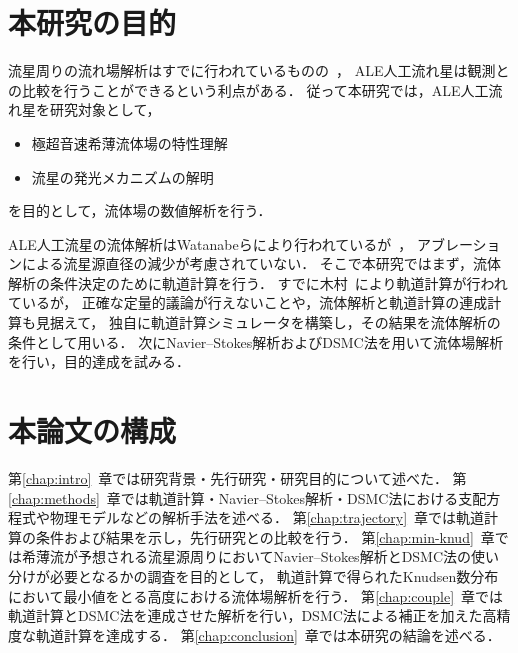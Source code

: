 \section{本研究の目的}

流星周りの流れ場解析はすでに行われているものの~\cite{silber2017shock}，
ALE人工流れ星は観測との比較を行うことができるという利点がある．
従って本研究では，ALE人工流れ星を研究対象として，
\begin{itemize}
    \item 極超音速希薄流体場の特性理解
    \item 流星の発光メカニズムの解明
\end{itemize}
を目的として，流体場の数値解析を行う．

ALE人工流星の流体解析はWatanabeらにより行われているが~\cite{watanabe2016development}，
アブレーションによる流星源直径の減少が考慮されていない．
そこで本研究ではまず，流体解析の条件決定のために軌道計算を行う．
すでに木村~\cite{kimura2018master}により軌道計算が行われているが，
正確な定量的議論が行えないことや，流体解析と軌道計算の連成計算も見据えて，
独自に軌道計算シミュレータを構築し，その結果を流体解析の条件として用いる．
次にNavier–Stokes解析およびDSMC法を用いて流体場解析を行い，目的達成を試みる．


\section{本論文の構成}

第\ref{chap:intro}~章では研究背景・先行研究・研究目的について述べた．
第\ref{chap:methods}~章では軌道計算・Navier–Stokes解析・DSMC法における支配方程式や物理モデルなどの解析手法を述べる．
第\ref{chap:trajectory}~章では軌道計算の条件および結果を示し，先行研究との比較を行う．
第\ref{chap:min-knud}~章では希薄流が予想される流星源周りにおいてNavier–Stokes解析とDSMC法の使い分けが必要となるかの調査を目的として，
軌道計算で得られたKnudsen数分布において最小値をとる高度における流体場解析を行う．
第\ref{chap:couple}~章では軌道計算とDSMC法を連成させた解析を行い，DSMC法による補正を加えた高精度な軌道計算を達成する．
第\ref{chap:conclusion}~章では本研究の結論を述べる．



